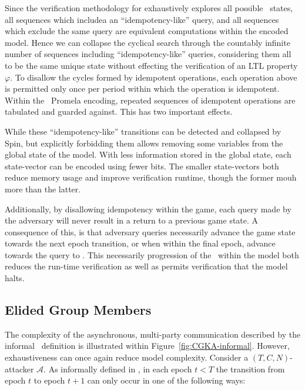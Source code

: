 Since the verification methodology for  exhaustively explores all possible \CGKAsec\ states, all sequences which includea an ``idempotency-like'' query, and all sequences which exclude the same query are equivalent computations within the encoded model.
Hence we can collapse the cyclical search through the countably infinite number of sequences including ``idempotency-like'' queries, considering them all to be the same unique state without effecting the verification of an LTL property \(\varphi\).
To disallow the cycles formed by idempotent operations, each operation above is permitted only once per period within which the operation is idempotent.
Within the \CGKAmod{}{}{}\ Promela encoding, repeated sequences of idempotent operations are tabulated and guarded against.
This has two important effects.

While these ``idempotency-like'' transitions can be detected and collapsed by Spin, but explicitly forbidding them allows removing some variables from the global state of the model.
With less information stored in the global state, each state-vector can be encoded using fewer bits.
The smaller state-vectors both reduce memory usage and improve verification runtime, though the former mouh more than the latter.

Additionally, by disallowing idempotency within the game, each query made by the adversary will never result in a return to a previous game state.
A consequence of this, is that adversary queries necessarily advance the game state towards the next epoch transition, or when within the final epoch, advance towards the query to .
This necessarily progression of the \CGKAsec\ within the model  both reduces the run-time verification as well as permits verification that the model  halts.


\hypertarget{sec:elided-group-members}{%
\subsection{Elided Group Members}\label{sec:elided-group-members}}

The complexity of the asynchronous, multi-party communication described by the informal \CGKAsec\ definition is illustrated within Figure\ \ref{fig:CGKA-informal}.
However, exhaustiveness can once again reduce model complexity.
Consider a \((T, C, N)\)-attacker \(\mathcal{A}\).
As informally defined in \autocite{alwen2020security}, in each epoch $t < T$ the transition from epoch $t$ to epoch $t+1$ can only occur in one of the following ways:

